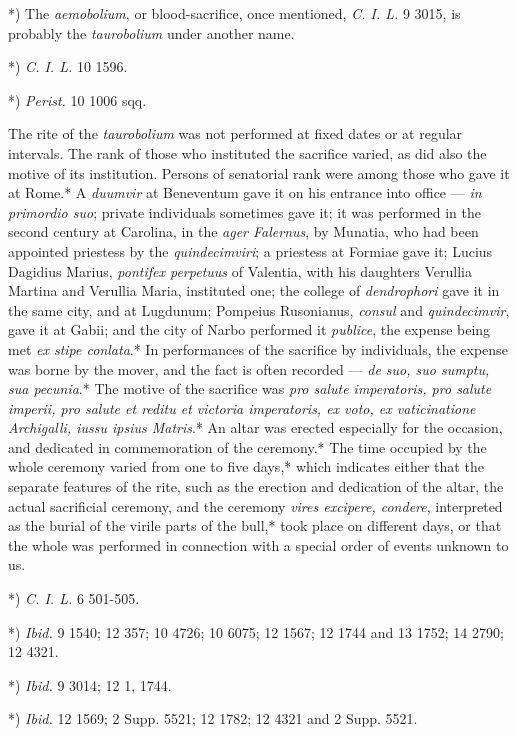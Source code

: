 \documentclass[a4paper, 11pt, oneside, polutonikogreek, english]{article}
\begin{document}
*) The \emph{aemobolium}, or blood-sacrifice, once mentioned, \emph{C. I. L.} 9 3015, is probably the \emph{taurobolium} under another name.

*) \emph{C. I. L.} 10 1596.

*) \emph{Perist.} 10 1006 sqq.

The rite of the \emph{taurobolium} was not performed at fixed dates or at regular intervals. The rank of those who instituted the sacrifice varied, as did also the motive of its institution. Persons of senatorial rank were among those who gave it at Rome.* A \emph{duumvir} at Beneventum gave it on his entrance into office --- \emph{in primordio suo}; private individuals sometimes gave it; it was performed in the second century at Carolina, in the \emph{ager Falernus}, by Munatia, who had been appointed priestess by the \emph{quindecimviri}; a priestess at Formiae gave it; Lucius Dagidius Marius, \emph{pontifex perpetuus} of Valentia, with his daughters Verullia Martina and Verullia Maria, instituted one; the college of \emph{dendrophori} gave it in the same city, and at Lugdunum; Pompeius Rusonianus, \emph{consul} and \emph{quindecimvir}, gave it at Gabii; and the city of Narbo performed it \emph{publice}, the expense being met \emph{ex stipe conlata}.* In performances of the sacrifice by individuals, the expense was borne by the mover, and the fact is often recorded --- \emph{de suo, suo sumptu, sua pecunia}.* The motive of the sacrifice was \emph{pro salute imperatoris, pro salute imperii, pro salute et reditu et victoria imperatoris, ex voto, ex vaticinatione Archigalli, iussu ipsius Matris}.* An altar was erected especially for the occasion, and dedicated in commemoration of the ceremony.* The time occupied by the whole ceremony varied from one to five days,* which indicates either that the separate features of the rite, such as the erection and dedication of the altar, the actual sacrificial ceremony, and the ceremony \emph{vires excipere, condere}, interpreted as the burial of the virile parts of the bull,* took place on different days, or that the whole was performed in connection with a special order of events unknown to us.

*) \emph{C. I. L.} 6 501-505.

*) \emph{Ibid.} 9 1540; 12 357; 10 4726; 10 6075; 12 1567; 12 1744 and 13 1752; 14 2790; 12 4321.

*) \emph{Ibid.} 9 3014; 12 1, 1744.

*) \emph{Ibid.} 12 1569; 2 Supp. 5521; 12 1782; 12 4321 and 2 Supp. 5521.
\end{document}
